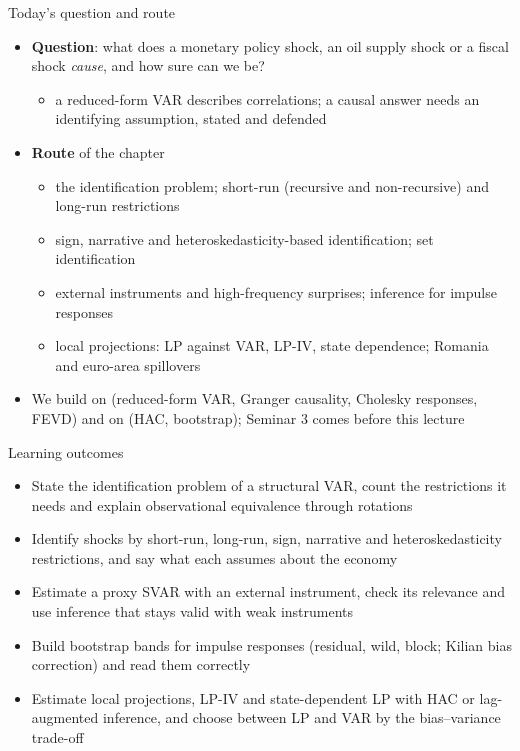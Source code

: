 \begin{frame}{Today's question and route}
\itemsize{\small}
\begin{itemize}
    \item \textbf{Question}: what does a monetary policy shock, an oil supply shock or a fiscal shock \emph{cause}, and how sure can we be?
    \begin{itemize}
        \item a reduced-form VAR describes correlations; a causal answer needs an identifying assumption, stated and defended
    \end{itemize}
    \item \textbf{Route} of the chapter
    \begin{itemize}
        \item the identification problem; short-run (recursive and non-recursive) and long-run restrictions
        \item sign, narrative and heteroskedasticity-based identification; set identification
        \item external instruments and high-frequency surprises; inference for impulse responses
        \item local projections: LP against VAR, LP-IV, state dependence; Romania and euro-area spillovers
    \end{itemize}
    \item We build on  (reduced-form VAR, Granger causality, Cholesky responses, FEVD) and on  (HAC, bootstrap); Seminar 3 comes before this lecture
\end{itemize}
\end{frame}

\begin{frame}{Learning outcomes}
\itemsize{\small}
\begin{itemize}
    \item State the identification problem of a structural VAR, count the restrictions it needs and explain observational equivalence through rotations
    \item Identify shocks by short-run, long-run, sign, narrative and heteroskedasticity restrictions, and say what each assumes about the economy
    \item Estimate a proxy SVAR with an external instrument, check its relevance and use inference that stays valid with weak instruments
    \item Build bootstrap bands for impulse responses (residual, wild, block; Kilian bias correction) and read them correctly
    \item Estimate local projections, LP-IV and state-dependent LP with HAC or lag-augmented inference, and choose between LP and VAR by the bias--variance trade-off
\end{itemize}
\end{frame}

